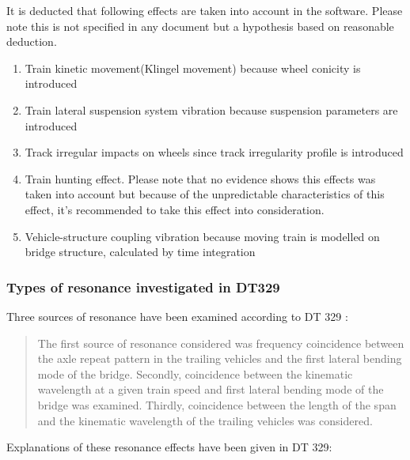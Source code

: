 It is deducted that following effects are taken into account in the software. Please note this is not specified in any document but a hypothesis based on reasonable deduction. 
\begin{enumerate}
    \item Train kinetic movement(Klingel movement) because wheel conicity is introduced
    \item Train lateral suspension system vibration because suspension parameters are introduced
    \item Track irregular impacts on wheels since track irregularity profile is introduced
    \item Train hunting effect. Please note that no evidence shows this effects was taken into account but because of the unpredictable characteristics of this effect, it's recommended to take this effect into consideration.
    \item Vehicle-structure coupling vibration because moving train is modelled on bridge structure, calculated by time integration
\end{enumerate}

\subsubsection{Types of resonance investigated in DT329} \label{sec:resonanceinvestigated}

Three sources of resonance have been examined according to DT 329 \cite{d181dt329}:

\begin{quote}
The first source of resonance considered was frequency coincidence between the axle repeat pattern in the trailing vehicles and the first lateral bending mode of the bridge. Secondly, coincidence between the kinematic wavelength at a given train speed and first lateral bending mode of the bridge was examined. Thirdly, coincidence between the length of the span and the kinematic wavelength of the trailing vehicles was considered.
\end{quote}

Explanations of these resonance effects have been given in DT 329:

